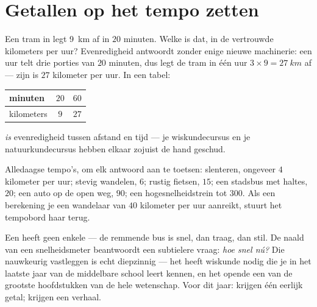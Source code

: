 \section{Getallen op het tempo zetten}

\begin{example}\label{ex:g6:describing-motion:proportion}
Een tram in  legt \qty{9}{km} af in $20$ minuten.
Welke  is dat, in de vertrouwde kilometers per uur?
Evenredigheid antwoordt zonder enige nieuwe machinerie: een uur telt
drie porties van $20$ minuten, dus legt de tram in één uur
$3 \times 9 = \qty{27}{km}$ af --- zijn  is $27$ kilometer per
uur. In een tabel:
\begin{center}
\begin{tabular}{l|cc}
minuten & $20$ & $60$ \\
\hline
kilometers & $9$ & $27$
\end{tabular}
\end{center}
 \emph{is} evenredigheid tussen afstand en tijd
--- je wiskundecursus en je natuurkundecursus hebben elkaar zojuist de
hand geschud.
\end{example}

\begin{example}\label{ex:g6:describing-motion:paces}
Alledaagse tempo's, om elk antwoord aan te toetsen: slenteren,
ongeveer $4$ kilometer per uur; stevig wandelen, $6$; rustig fietsen,
$15$; een stadsbus met haltes, $20$; een auto op de open weg, $90$;
een hogesnelheidstrein tot $300$. Als een berekening je een wandelaar
van $40$ kilometer per uur aanreikt, stuurt het tempobord haar terug.
\end{example}

\begin{remark}\label{rem:g6:describing-motion:instant}
Een  heeft geen enkele  --- de
remmende bus is snel, dan traag, dan stil. De naald van een
snelheidsmeter beantwoordt een subtielere vraag: \emph{hoe snel nú?}
Die  nauwkeurig vastleggen is echt diepzinnig --- het
heeft wiskunde nodig die je in het laatste jaar van de middelbare
school leert kennen, en het opende een van de grootste hoofdstukken
van de hele wetenschap. Voor dit jaar:  krijgen
één eerlijk getal;  krijgen een verhaal.
\end{remark}

